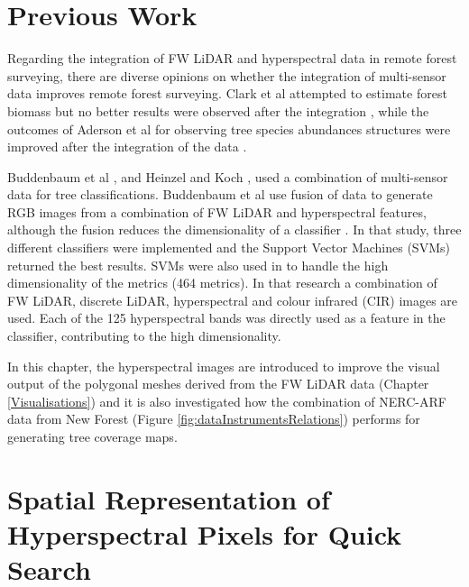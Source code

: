 \documentclass{subfiles}
\begin{document}
	\section{Previous Work}
	
	\par Regarding the integration of FW LiDAR and hyperspectral data in remote forest surveying, there are diverse opinions on whether the integration of multi-sensor data improves remote forest surveying. Clark et al attempted to estimate forest biomass but no better results were observed after the integration \cite{Clark2011}, while the outcomes of Aderson et al for observing tree species abundances structures were improved after the integration of the data \cite{Anderson2008}. 
	
	\par  Buddenbaum et al \cite{Buddenbaum2013}, and Heinzel and Koch \cite{Heinzel2012}, used a combination of multi-sensor data for tree classifications. Buddenbaum et al use fusion of data to generate RGB images from a combination of FW LiDAR and hyperspectral features, although the fusion reduces the dimensionality of a classifier \cite{Buddenbaum2013}. In that study, three different classifiers were implemented and the Support Vector Machines (SVMs) returned the best results. SVMs were also used in \cite{Heinzel2012} to handle the high dimensionality of the metrics (464 metrics). In that research a combination of FW LiDAR, discrete LiDAR, hyperspectral and colour infrared (CIR) images are used. Each of the 125 hyperspectral bands was directly used as a feature in the classifier, contributing to the high dimensionality. 
	
	\par In this chapter, the hyperspectral images are introduced to improve the visual output of the polygonal meshes derived from the FW LiDAR data (Chapter \ref{Visualisations}) and it is also investigated how the combination of NERC-ARF data from New Forest  (Figure \ref{fig:dataInstrumentsRelations}) performs for generating tree coverage maps. 
	
	
	

	


	
\section{Spatial Representation of Hyperspectral Pixels for Quick Search}\label{sec:SpatialRepresentation}
\end{document}
